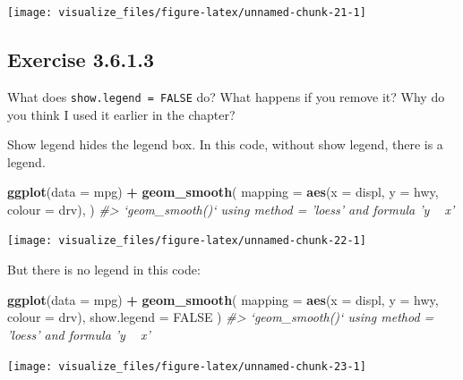 \documentclass[]{book}
\newenvironment{Shaded}{\begin{snugshade}}{\end{snugshade}}
\newcommand{\CommentTok}[1]{\textcolor[rgb]{0.56,0.35,0.01}{\textit{#1}}}
\newcommand{\DataTypeTok}[1]{\textcolor[rgb]{0.13,0.29,0.53}{#1}}
\newcommand{\KeywordTok}[1]{\textcolor[rgb]{0.13,0.29,0.53}{\textbf{#1}}}
\newcommand{\NormalTok}[1]{#1}
\newcommand{\OperatorTok}[1]{\textcolor[rgb]{0.81,0.36,0.00}{\textbf{#1}}}
\newcommand{\OtherTok}[1]{\textcolor[rgb]{0.56,0.35,0.01}{#1}}
\newcommand{\StringTok}[1]{\textcolor[rgb]{0.31,0.60,0.02}{#1}}
\theoremstyle{plain}
\theoremstyle{remark}
\begin{document}
\begin{center}\texttt{[image: visualize\_files/figure-latex/unnamed-chunk-21-1]} \end{center}

\hypertarget{exercise-3.6.1.3}{%
\subsection*{\texorpdfstring{Exercise {3.6.1.3}}{Exercise 3.6.1.3}}\label{exercise-3.6.1.3}}

What does \texttt{show.legend\ =\ FALSE} do? What happens if you remove it?
Why do you think I used it earlier in the chapter?

Show legend hides the legend box. In this code, without show legend, there is a legend.

\begin{Shaded}
\begin{Highlighting}[]
\KeywordTok{ggplot}\NormalTok{(}\DataTypeTok{data =}\NormalTok{ mpg) }\OperatorTok{+}
\StringTok{  }\KeywordTok{geom_smooth}\NormalTok{(}
    \DataTypeTok{mapping =} \KeywordTok{aes}\NormalTok{(}\DataTypeTok{x =}\NormalTok{ displ, }\DataTypeTok{y =}\NormalTok{ hwy, }\DataTypeTok{colour =}\NormalTok{ drv),}
\NormalTok{  )}
\CommentTok{#> `geom_smooth()` using method = 'loess' and formula 'y ~ x'}
\end{Highlighting}
\end{Shaded}

\begin{center}\texttt{[image: visualize\_files/figure-latex/unnamed-chunk-22-1]} \end{center}

But there is no legend in this code:

\begin{Shaded}
\begin{Highlighting}[]
\KeywordTok{ggplot}\NormalTok{(}\DataTypeTok{data =}\NormalTok{ mpg) }\OperatorTok{+}
\StringTok{  }\KeywordTok{geom_smooth}\NormalTok{(}
    \DataTypeTok{mapping =} \KeywordTok{aes}\NormalTok{(}\DataTypeTok{x =}\NormalTok{ displ, }\DataTypeTok{y =}\NormalTok{ hwy, }\DataTypeTok{colour =}\NormalTok{ drv),}
    \DataTypeTok{show.legend =} \OtherTok{FALSE}
\NormalTok{  )}
\CommentTok{#> `geom_smooth()` using method = 'loess' and formula 'y ~ x'}
\end{Highlighting}
\end{Shaded}

\begin{center}\texttt{[image: visualize\_files/figure-latex/unnamed-chunk-23-1]} \end{center}
\end{document}
